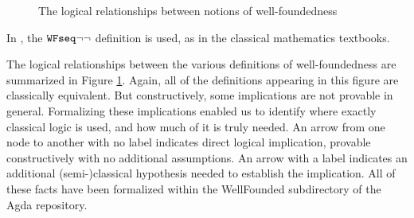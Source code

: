 \begin{figure}[hb]
\caption{The logical relationships between notions of well-foundedness}
 \label{fig:WF} 
\end{figure}
\clearpage

In \cite{Terese}, the $\mathtt{WFseq}{\lnot\lnot}$ definition is used, as in the classical mathematics textbooks.

The logical relationships between the various definitions of well-foundedness are summarized in 
Figure \ref{fig:WF}.
Again, all of the definitions appearing in this figure are classically equivalent.
But constructively, some implications are not provable in general.
Formalizing these implications enabled us to identify where exactly classical logic 
is used, and how much of it is truly needed.
An arrow from one node to another with no label indicates direct logical implication,
provable constructively with no additional assumptions. An arrow with a label indicates an additional 
(semi-)classical hypothesis needed to establish the implication. All of these facts have been 
formalized within the WellFounded subdirectory of the Agda repository.





